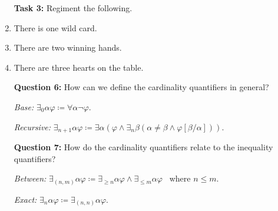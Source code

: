\documentclass[a4paper, 11pt]{article} %
\newcommand{\qt}[2]{#1 #2} %
\newcommand{\unisub}[2]{[#1/#2]}
\begin{document}
\begin{enumerate}
  \item[\bf Task 3:] Regiment the following.
  \item There is one wild card.
  \item There are two winning hands.
  \item There are three hearts on the table.
  \item[\bf Question 6:] How can we define the cardinality quantifiers in general?
  \item[\it Base:] $\qt{\exists_0}{\alpha}\varphi \coloneq \qt{\forall}{\alpha}\neg\varphi$.
  \item[\it Recursive:] $\qt{\exists_{n+1}}{\alpha}\varphi \coloneq \qt{\exists}{\alpha}(\varphi \wedge \qt{\exists_n}{\beta}(\alpha \neq \beta \wedge \varphi\unisub{\beta}{\alpha}))$.
  \item[\bf Question 7:] How do the cardinality quantifiers relate to the inequality quantifiers?
  \item[\it Between:] $\qt{\exists_{(n,m)}}{\alpha}\varphi \coloneq \qt{\exists_{\geq n}}{\alpha}\varphi \wedge \qt{\exists_{\leq m}}{\alpha}\varphi$~ where $n\leq m$.
  \item[\it Exact:] $\qt{\exists_{n}}{\alpha}\varphi \coloneq \qt{\exists_{(n,n)}}{\alpha}\varphi.$
\end{enumerate}






\end{document}
